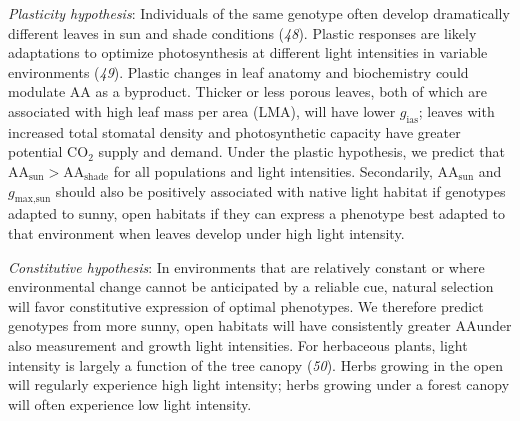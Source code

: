 \documentclass[
  letterpaper,
  DIV=11,
  numbers=noendperiod]{scrartcl}
\newcommand{\aashade}{\mathrm{AA}_{\text{shade}}}
\newcommand{\aasun}{\mathrm{AA}_{\text{sun}}}
\newcommand{\aax}{$\mathrm{AA}$}
\newcommand{\gmaxsun}{$g_\text{max,sun}$}
\begin{document}
\emph{Plasticity hypothesis}: Individuals of the same genotype often
develop dramatically different leaves in sun and shade conditions
(\emph{48}). Plastic responses are likely adaptations to optimize
photosynthesis at different light intensities in variable environments
(\emph{49}). Plastic changes in leaf anatomy and biochemistry could
modulate \aax{} as a byproduct. Thicker or less porous leaves, both of
which are associated with high leaf mass per area (LMA), will have lower
\(g_\mathrm{ias}\); leaves with increased total stomatal density and
photosynthetic capacity have greater potential CO\(_2\) supply and
demand. Under the plastic hypothesis, we predict that
\(\aasun{} > \aashade{}\) for all populations and light intensities.
Secondarily, \(\aasun{}\) and \gmaxsun{} should also be positively
associated with native light habitat if genotypes adapted to sunny, open
habitats if they can express a phenotype best adapted to that
environment when leaves develop under high light intensity.

\emph{Constitutive hypothesis}: In environments that are relatively
constant or where environmental change cannot be anticipated by a
reliable cue, natural selection will favor constitutive expression of
optimal phenotypes. We therefore predict genotypes from more sunny, open
habitats will have consistently greater \aax under also measurement and
growth light intensities. For herbaceous plants, light intensity is
largely a function of the tree canopy (\emph{50}). Herbs growing in the
open will regularly experience high light intensity; herbs growing under
a forest canopy will often experience low light intensity.
\end{document}
